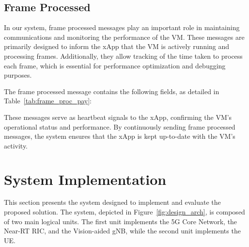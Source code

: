 \subsection{Frame Processed}\label{subsec:frame-processed}
In our system, frame processed messages play an important role in maintaining communications and monitoring the performance of the VM\@.
These messages are primarily designed to inform the xApp that the VM is actively running and processing frames.
Additionally, they allow tracking of the time taken to process each frame, which is essential for performance optimization and debugging purposes.

The frame processed message contains the following fields, as detailed in Table~\ref{tab:frame_proc_pay}:

\begin{table}[H]
    \caption{Components of the Frame Processed message payload.}
    \label{tab:frame_proc_pay}
    \centering
\end{table}

These messages serve as heartbeat signals to the xApp, confirming the VM's operational status and performance.
By continuously sending frame processed messages, the system ensures that the xApp is kept up-to-date with the VM's activity.


\section{System Implementation}\label{sec:system-implementation}

This section presents the system designed to implement and evaluate the proposed solution.
The system, depicted in Figure~\ref{fig:design_arch}, is composed of two main logical units.
The first unit implements the 5G Core Network, the Near-RT RIC, and the Vision-aided gNB, while the second unit implements the UE\@.

